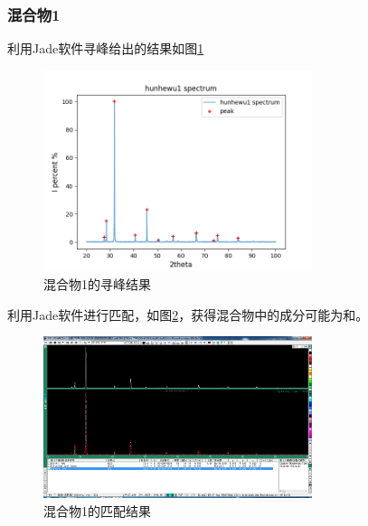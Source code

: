 \documentclass[10pt]{ctexart}
\begin{document}
\subsubsection{混合物1}
利用Jade软件寻峰给出的结果如图\ref{fig:hunhewu1}
\begin{figure}
    \centering
    \includegraphics[width=0.7\textwidth]{data/hunhewu1/spectrum.png}
    \caption{混合物1的寻峰结果}
    \label{fig:hunhewu1}
\end{figure}
利用Jade软件进行匹配，如图\ref{fig:hunhewu1Match}，获得混合物中的成分可能为和。
\begin{figure}
    \centering
    \includegraphics[width=0.7\textwidth]{data/hunhewu1/1.png}
    \caption{混合物1的匹配结果}
    \label{fig:hunhewu1Match}
\end{figure}
\end{document}
